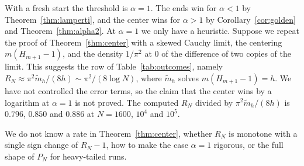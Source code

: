 \begin{remark}[the exponent $\alpha=1$ and the fresh start]\label{rem:other}
With a fresh start the threshold is $\alpha=1$. The ends win for $\alpha<1$
by Theorem~\ref{thm:lamperti}, and the center wins for $\alpha>1$ by
Corollary~\ref{cor:golden} and Theorem~\ref{thm:alpha2}. At $\alpha=1$ we
only have a heuristic. Suppose we repeat the proof of
Theorem~\ref{thm:center} with a skewed Cauchy limit, the centering
$m(H_{m+1}-1)$, and the density $1/\pi^2$ at $0$ of the difference of two
copies of the limit. This suggests the row of Table~\ref{tab:outcomes},
namely $R_N\approx\pi^2\tilde m_h/(8h)\sim\pi^2/(8\log N)$, where
$\tilde m_h$ solves $m(H_{m+1}-1)=h$. We have not controlled the error
terms, so the claim that the center wins by a logarithm at $\alpha=1$ is not
proved. The computed $R_N$ divided by $\pi^2\tilde m_h/(8h)$ is $0.796$,
$0.850$ and $0.886$ at $N=1600$, $10^4$ and $10^5$.
\end{remark}

We do not know a rate in Theorem~\ref{thm:center}, whether $R_N$ is monotone
with a single sign change of $R_N-1$, how to make the case $\alpha=1$
rigorous, or the full shape of $P_N$ for heavy-tailed runs.
